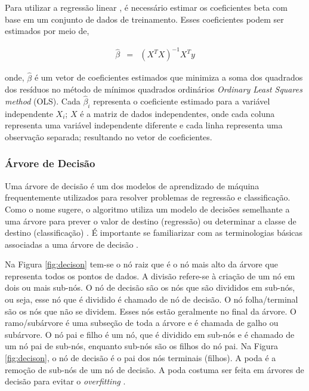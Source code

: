  
 Para utilizar a regressão linear \cite{korstanje2021}, é necessário estimar os coeficientes beta com base em um conjunto de dados de treinamento. Esses coeficientes podem ser estimados por meio de,
 
 \begin{eqnarray}
 	\hat{\beta}&=&\left(X^T X\right)^{-1} X^T y\label{eq:ols}
 \end{eqnarray}
 
 \noindent onde, $\hat{\beta}$ é um vetor de coeficientes estimados que minimiza a soma dos quadrados dos resíduos no método de mínimos quadrados ordinários  \textit{Ordinary Least Squares method} (OLS). Cada $\hat{\beta}_i$ representa o coeficiente estimado para a variável independente $X_i$;
 $X$ é a matriz de dados independentes, onde cada coluna representa uma variável independente diferente e cada linha representa uma observação separada;
 resultando no vetor de coeficientes.
 
 
 \subsubsection{\'Arvore de Decis\~ao}
 
 Uma árvore de decisão é um dos modelos de aprendizado de máquina frequentemente utilizados para resolver problemas de regressão e classificação. Como o nome sugere, o algoritmo utiliza um modelo de decisões semelhante a uma árvore para prever o valor de destino (regressão) ou determinar a classe de destino (classificação) \cite{SHI2023110022}. É importante se familiarizar com as terminologias básicas associadas a uma árvore de decisão \cite{SINGHKUSHWAH20223571}.
 
 Na Figura \ref{fig:decison} tem-se o nó raiz que é o nó mais alto da árvore que representa todos os pontos de dados. A divisão refere-se à criação de um nó em dois ou mais sub-nós.
 O nó de decisão são os nós que são divididos em sub-nós, ou seja, esse nó que é dividido é chamado de nó de decisão. O nó folha/terminal são os nós que não se dividem. Esses nós estão geralmente no final da árvore. O ramo/subárvore é uma subseção de toda a árvore e é chamada de galho ou subárvore. O nó pai e filho é um nó, que é dividido em sub-nós e é chamado de um nó pai de sub-nós, enquanto sub-nós são os filhos do nó pai. Na Figura \ref{fig:decison}, o nó de decisão é o pai dos nós terminais (filhos).
 A poda é a remoção de sub-nós de um nó de decisão. A poda costuma ser feita em árvores de decisão para evitar o \textit{overfitting}  \cite{decision}.
 
